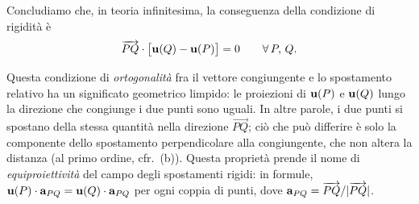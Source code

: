 Concludiamo che, in teoria infinitesima, la conseguenza della condizione di rigidità è 
%
%
\begin{equation}\label{eq:ortogonalita_CR}
	\overrightarrow{PQ} \cdot \bigl[\mathbf{u}(Q) - \mathbf{u}(P)\bigr] = 0
	\qquad \forall\, P,\, Q.
\end{equation}




Questa condizione di \textit{ortogonalità} fra il vettore congiungente e 
lo spostamento relativo ha un significato geometrico limpido: le proiezioni 
di $\mathbf{u}(P)$ e $\mathbf{u}(Q)$ lungo la direzione che congiunge i due punti sono 
uguali. In altre parole, i due punti si spostano della stessa quantità nella 
direzione $\overrightarrow{PQ}$; ciò che può differire è solo la componente 
dello spostamento perpendicolare alla congiungente, che non altera la distanza 
(al primo ordine, cfr.~(b)).
Questa proprietà prende il nome di \textit{equiproiettività}
del campo degli spostamenti rigidi: in formule,
$\mathbf{u}(P) \cdot \mathbf{a}_{PQ} = \mathbf{u}(Q) \cdot \mathbf{a}_{PQ}$ per ogni
coppia di punti, dove
$\mathbf{a}_{PQ} = \overrightarrow{PQ}/|\overrightarrow{PQ}|$. 






